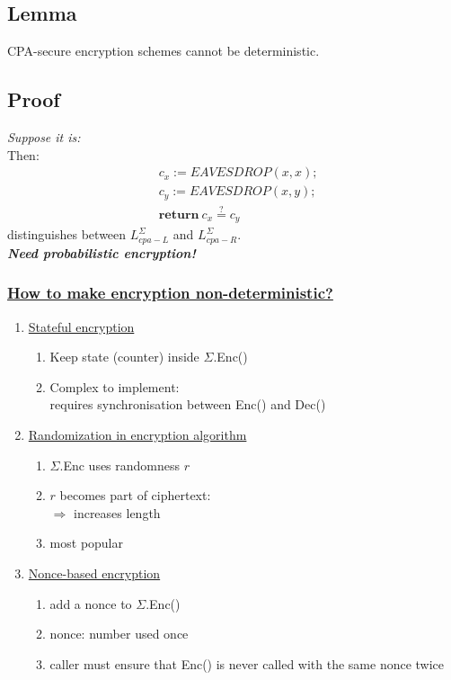 \documentclass{report}
\begin{document}
	 \subsection*{Lemma}
	 CPA-secure encryption schemes cannot be deterministic.
	 \subsection*{Proof}
	 \textit{Suppose it is:} \\
	 Then: 
	 \begin{align*}
	 	& c_x := EAVESDROP(x,x); \\
	 	& c_y := EAVESDROP(x,y); \\
	 	& \textbf{return} \ c_x \stackrel{?}{=} c_y
	 \end{align*}
	 distinguishes between $L_{cpa-L}^{\Sigma}$ and $L_{cpa-R}^{\Sigma}$. \\
	 \textit{\textbf{Need probabilistic encryption!}}
	 \subsubsection*{\underline{How to make encryption non-deterministic?}}
	 \begin{enumerate}
	 	\item \underline{Stateful encryption}
	 	\begin{enumerate}[-]
	 		\item Keep state (counter) inside $\Sigma$.Enc()
	 		\item Complex to implement: \\
	 		requires synchronisation between Enc() and Dec()
	 	\end{enumerate}
	 	\item \underline{Randomization in encryption algorithm}
	 	\begin{enumerate}[-]
	 		\item $\Sigma$.Enc uses randomness $r$
	 		\item $r$ becomes part of ciphertext: \\
	 		$\Rightarrow$ increases length
	 		\item most popular
	 	\end{enumerate}
	 	\item \underline{Nonce-based encryption}
	 	\begin{enumerate}[-]
	 		\item add a nonce to $\Sigma$.Enc()
	 		\item nonce: number used once
	 		\item caller must ensure that Enc() is never called with the same nonce twice
	 	\end{enumerate}
	 \end{enumerate}
\end{document}
